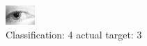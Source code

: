 \begin{figure}[h!]
\begin{center}
\includegraphics[width=0.60\columnwidth]{figures/ID1377_class_4_target_3.png}
\end{center}
\caption{ Classification: 4 actual target: 3}
\label{fig:ID1377_class_4_target_3}
\end{figure}

